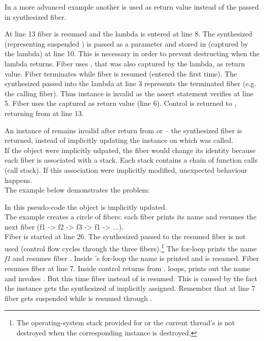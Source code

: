 In a more advanced example another \fiber is used as return value instead of the
passed in synthesized fiber.

At line 13 fiber  is resumed and the lambda is entered at line 8. The
synthesized \fiber\xspace {} (representing suspended \main) is passed as a
parameter  and stored in  (captured by the lambda) at line 10.
This is necessary in order to prevent destructing  when the lambda
returns. Fiber  uses , that was also captured by the lambda, as
return value. Fiber  terminates while fiber  is resumed (entered
the first time). The synthesized \fiber\xspace {} passed into the lambda at line 3
represents the terminated fiber  (e.g. the calling fiber). Thus instance
 is invalid as the assert statement verifies at line 5. Fiber  uses
the captured \fiber\xspace {} as return value (line 6). Control is returned to
\main, returning from  at line 13.\\


\label{fiberreturn}
An instance of \fiber remains invalid after return from \resume or \resumewith --
the synthesized fiber is returned, instead of implicitly updating the \fiber
instance on which \resume was called.\\
If the \fiber object were implicitly udpated, the fiber would 
change its identity because each fiber is associated with a stack. Each stack
contains a chain of function calls (call stack). If this association were
implicitly modified, unexpected behaviour happens.\\
The example below demonstrates the problem:

In this pseudo-code the \fiber object is implicitly updated.\\
The example creates a circle of fibers: each fiber prints its name and resumes
the next fiber (f1 -> f2 -> f3 -> f1 -> ...).\\
Fiber  is started at line 26. The synthesized \fiber\xspace {} passed 
to the resumed fiber is not used (control flow cycles through the three
fibers).\footnote{The operating-system stack provided for \main or the current
thread's \entryfn\xspace is not destroyed when the corresponding \fiber instance is
destroyed.}
The for-loop prints the name \emph{f1} and resumes fiber . Inside 
's for-loop the name is printed and  is resumed. Fiber 
resumes fiber  at line 7. Inside  control returns from
.  loops, prints out the name and invokes . But
this time fiber  instead of  is resumed. This is caused by the
fact the instance  gets the synthesized \fiber of  implicitly
assigned. Remember that at line 7 fiber  gets suspended while 
is resumed through .\\

